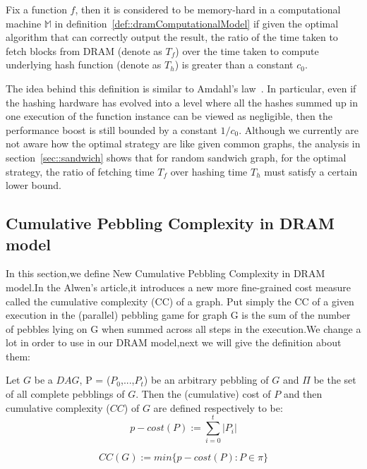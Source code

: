 
\begin{definition}\label{def::memoryHard}%
  Fix a function $f$, then it is considered to be memory-hard in a computational machine $\mathbb{M}$ in definition~\ref{def::dramComputationalModel}
  if given the optimal algorithm that can correctly output the result, the ratio of the time taken to fetch blocks from DRAM (denote as $T_f$) over
  the time taken to compute underlying hash function (denote as $T_h$) is greater than a constant $c_0$.
\end{definition}

The idea behind this definition is similar to Amdahl's law~\cite{amdahl1967validity}. In particular, even if the hashing hardware has evolved into
a level where all the hashes summed up in one execution of the function instance can be viewed as negligible, then the performance boost is
still bounded by a constant $1/c_0$. Although we currently are not aware how the optimal strategy are like given common graphs, the analysis in
section~\ref{sec::sandwich} shows that for random sandwich graph, for the optimal strategy, the ratio of fetching time $T_f$ over hashing time $T_h$
must satisfy a certain lower bound.

\subsection{Cumulative Pebbling Complexity in DRAM model}
In this section,we define New Cumulative Pebbling Complexity in DRAM model.In the Alwen's article,it introduces a new more fine-grained cost measure called the cumulative complexity (CC) of a graph. Put simply the CC of a given execution in the (parallel) pebbling game for graph G is the sum of the number of pebbles lying on G when summed across all steps in the execution.We change a lot in order to use in our DRAM model,next we will give the definition about them:

\begin{definition}\label{def::cumulativecomplexity}
Let $G$ be a $DAG$, P = ($P_0$,...,$P_t$) be an arbitrary pebbling of $G$ and $\Pi$ be the set of all complete pebblings of $G$. Then the (cumulative) cost of $P$ and then cumulative complexity ($CC$) of $G$ are defined respectively to be:\\
  \begin{equation}
    p-cost(P):= \sum\limits_{i=0}^t|P_i|
  \end{equation}

  \begin{equation}
    CC(G):= min\{p-cost(P):P \in \pi \}
  \end{equation}
\end{definition}

